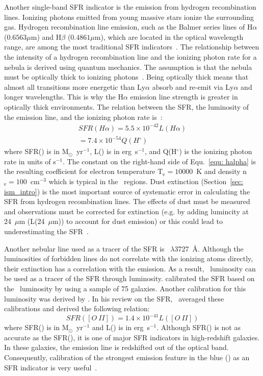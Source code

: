 Another single-band SFR indicator is the emission from hydrogen recombination lines. 
Ionizing photons emitted from young massive stars ionize the surrounding gas. Hydrogen recombination line emission, such as the Balmer series lines of H${\alpha}$ ($0.6563 \mu$m) and H${\beta}$ ($0.4861 \mu$m), which are located in the optical wavelength range, are among the most traditional SFR indicators~\citep{Kennicutt98a}. 
The relationship between the intensity of a hydrogen recombination line and the ionizing photon rate for a nebula is derived using quantum mechanics. 
The assumption is that the nebula must be optically thick to ionizing photons~\citep{Osterbrock06}.
Being optically thick means that almost all transitions more energetic than Ly${\alpha}$ absorb and re-emit via Ly${\alpha}$ and longer wavelengths.
This is why the H${\alpha}$ emission line strength is greater in optically thick environments. The relation between the SFR, the luminosity of the \halpha emission line, and the ionizing photon rate is~\citep[e.g.,][]{Osterbrock06, Kennicutt98b}:
\begin{align}
\label{equ: halpha}
SFR(H\alpha) = 5.5 \times 10^{-42}L(H\alpha) \\
                     = 7.4 \times 10^{-54}Q(H^{\circ})
\end{align}
where SFR(\halpha) is in M$_{\odot}$~yr$^{-1}$, L(\halpha) is in erg~s$^{-1}$, and Q(H$^{\circ}$) is the ionizing photon rate in units of s$^{-1}$.
The constant on the right-hand side of Equ.~\ref{equ: halpha} is the resulting coefficient for electron temperature T$_{\mathrm{e}}=10000$~K and density n$_{\mathrm{e}}=100$~cm$^{-3}$ which is typical in the \hii~regions.
Dust extinction (Section~\ref{sec: ism_intro}) is the most important source of systematic error in calculating the SFR from hydrogen recombination lines.
The effects of dust must be measured and \halpha observations must be corrected for extinction (e.g. by adding lumincity at 24~$\mu$m (L(24~$\mu$m)) to account for dust emission) or this could lead to underestimating the SFR~\citep{Kennicutt98b}.


Another nebular line used as a tracer of the SFR is \oii~$\lambda$3727~\AA. 
Although the luminosities of forbidden lines do not correlate with the ionizing atoms directly, their extinction has a correlation with the \halpha emission. 
As a result, \oii~luminosity can be used as a tracer of the SFR through \halpha luminosity. 
\cite{Gallagher89} calibrated the SFR based on the \oii~luminosity by using a sample of 75 galaxies. 
Another calibration for this luminosity was derived by \cite{Kennicutt92}. 
In his review on the SFR,~\citep{Kennicutt98b} averaged these calibrations and derived the following relation:
\begin{equation}
SFR([O\ II]) = 1.4 \times 10^{-41} L([O\ II])
\end{equation}  
where SFR(\oii) is in M$_{\odot}$~yr$^{-1}$ and L(\oii) is in erg~s$^{-1}$.
Although SFR(\oii) is not as accurate as the SFR(\halpha), it is one of major SFR indicators in high-redshift galaxies.
In these galaxies, the \halpha emission line is redshifted out of the optical band.
Consequently, calibration of the strongest emission feature in the blue (\oii) as an SFR indicator is very useful~\citep{Kennicutt98b}.


